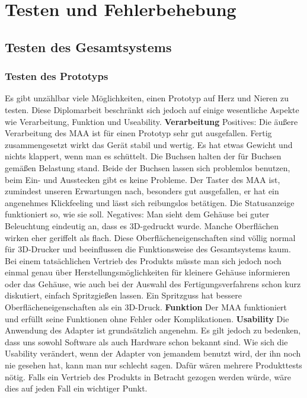 \documentclass[11pt, twoside]{article}
\begin{document}
\section{Testen und Fehlerbehebung}
\subsection{Testen des Gesamtsystems}
\subsubsection{Testen des Prototyps}
Es gibt unzählbar viele Möglichkeiten, einen Prototyp auf Herz und Nieren zu testen. Diese Diplomarbeit beschränkt sich jedoch auf einige wesentliche Aspekte wie Verarbeitung, Funktion und Useability.
\vspace{4mm}\newline
\textbf{Verarbeitung}
\vspace{4mm}\newline
Positives:\newline
Die äußere Verarbeitung des MAA ist für einen Prototyp sehr gut ausgefallen. Fertig zusammengesetzt wirkt das Gerät stabil und wertig. Es hat etwas Gewicht und nichts klappert, wenn man es schüttelt. Die Buchsen halten der für Buchsen gemäßen Belastung stand. Beide der Buchsen lassen sich problemlos benutzen, beim Ein- und Ausstecken gibt es keine Probleme. Der Taster des MAA ist, zumindest unseren Erwartungen nach, besonders gut ausgefallen, er hat ein angenehmes Klickfeeling und lässt sich reibungslos betätigen. Die Statusanzeige funktioniert so, wie sie soll.
\vspace{4mm}\newline
Negatives:\newline
Man sieht dem Gehäuse bei guter Beleuchtung eindeutig an, dass es 3D-gedruckt wurde. Manche Oberflächen wirken eher geriffelt als flach. Diese Oberflächeneigenschaften sind völlig normal für 3D-Drucker und beeinflussen die Funktionsweise des Gesamtsystems kaum. Bei einem tatsächlichen Vertrieb des Produkts müsste man sich jedoch noch einmal genau über Herstellungsmöglichkeiten für kleinere Gehäuse informieren oder das Gehäuse, wie auch bei der Auswahl des Fertigungsverfahrens schon kurz diskutiert, einfach Spritzgießen lassen. Ein Spritzguss hat bessere Oberflächeneigenschaften als ein 3D-Druck. \parencite[vgl.][]{noauthor_urlnl18_2020}
\vspace{4mm}\newline
\textbf{Funktion}\newline
Der MAA funktioniert und erfüllt seine Funktionen ohne Fehler oder Komplikationen.
\vspace{4mm}\newline
\textbf{Usability}\newline
Die Anwendung des Adapter ist grundsätzlich angenehm. Es gilt jedoch zu bedenken, dass uns sowohl Software als auch Hardware schon bekannt sind. Wie sich die Usability verändert, wenn der Adapter von jemandem benutzt wird, der ihn noch nie gesehen hat, kann man nur schlecht sagen. Dafür wären mehrere Produkttests nötig. Falls ein Vertrieb des Produkts in Betracht gezogen werden würde, wäre dies auf jeden Fall ein wichtiger Punkt.
\end{document}

